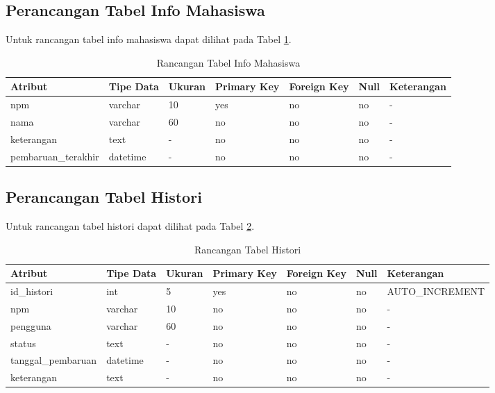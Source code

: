 \subsection{Perancangan Tabel Info Mahasiswa}
Untuk rancangan tabel info mahasiswa dapat dilihat pada Tabel
\ref{tab:rancangantabelinfomahasiswa}.

\begin{table}[h]
\caption[Tabel Rancangan Tabel Info Mahasiswa]{Rancangan Tabel Info Mahasiswa}
\label{tab:rancangantabelinfomahasiswa}
\begin{tabular}{|l|p{1.5cm}|p{1.2cm}|p{1.2cm}|p{1.2cm}|p{0.8cm}|l|}
\hline
Atribut & Tipe Data & Ukuran & Primary Key & Foreign Key & Null & Keterangan\\
\hline
npm & varchar & 10 & yes & no & no & -\\
\hline
nama & varchar & 60 & no & no & no & -\\
\hline
keterangan & text & - & no & no & no & -\\
\hline
pembaruan\_terakhir & datetime & - & no & no & no & -\\
\hline
\end{tabular}
\end{table}

\subsection{Perancangan Tabel Histori}
Untuk rancangan tabel histori dapat dilihat pada Tabel
\ref{tab:rancangantabelhistori}.

\begin{table}[h]
\caption[Tabel Rancangan Tabel Histori]{Rancangan Tabel Histori}
\label{tab:rancangantabelhistori}
\begin{tabular}{|l|p{1.5cm}|p{1.2cm}|p{1.2cm}|p{1.2cm}|p{0.8cm}|l|}
\hline
Atribut & Tipe Data & Ukuran & Primary Key & Foreign Key & Null & Keterangan\\
\hline
id\_histori & int & 5 & yes & no & no & AUTO\_INCREMENT\\
\hline
npm & varchar & 10 & no & no & no & -\\
\hline
pengguna & varchar & 60 & no & no & no & -\\
\hline
status & text & - & no & no & no & -\\
\hline
tanggal\_pembaruan & datetime & - & no & no & no & -\\
\hline
keterangan & text & - & no & no & no & -\\
\hline
\end{tabular}
\end{table}

